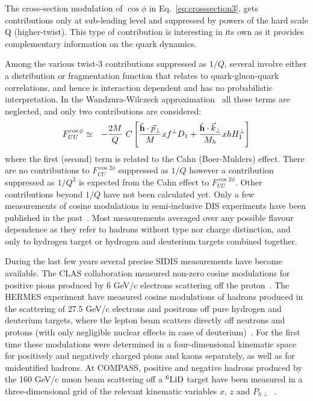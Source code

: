 \documentclass[aps,prl,twocolumn,showpacs,superscriptaddress,groupedaddress]{revtex4}  %
\newcommand{\Phperp}{P_{h\perp}}
\newcommand{\FUUc}{F_{UU}^{\cos\phi}}
\newcommand{\FUUcc}{F_{UU}^{\cos2\phi}}
\newcommand{\kt}{\vec{k}_\perp}
\newcommand{\pt}{\vec{p}_\perp}
\begin{document}
The cross-section modulation of  $\cos \phi $ in Eq.~\ref{eq:crosssection3}, gets contributions only
at sub-leading level and suppressed by powers of the hard scale Q (higher-twist).
This type of contribution is interesting in its own as it provides complementary information
on the quark dynamics.

Among the various twist-3 contributions suppressed as $1/Q$, several involve
either a distribution or fragmentation function that relates to
quark-gluon-quark correlations, and hence is interaction dependent and has no probabilistic
interpretation. In the Wandzura-Wilczeck approximation~\cite{Wandzura:1977qf}
all these terms are neglected, and only two contributions are considered: %
\begin{eqnarray} \nonumber
\label{Eq:cosphi}
\FUUc & \simeq & -\frac{2M}{Q}\  C\left[\frac{ \hat{\bf h} \cdot \pt}{M} xf^\perp D_1 +
\frac{\hat{\bf h} \cdot \kt}{M_h} 
xh H_1^\perp \right] \\
\end{eqnarray}
where the first (second) term is related to the Cahn (Boer-Mulders) effect.
There are no contributions to $\FUUcc$ suppressed as $1/Q$ however a contribution
suppressed as $1/Q^2$ is expected from the Cahn effect to $\FUUcc$. Other
contributions beyond $1/Q$ have not been calculated yet.
Only a few measurements of cosine modulations in semi-inclusive DIS experiments
have been published in the
past~\cite{Aubert:1983cz,Arneodo:1986cf,Adams:1993hs,Breitweg:2000qh}. Most
measurements averaged over any possible flavour dependence as they refer to
hadrons without type nor charge distinction, and only to hydrogen target or
hydrogen and deuterium targets combined together.

During the last few years several precise SIDIS measurements have become available. The CLAS
collaboration measured non-zero cosine modulations for positive pions produced
by 6 GeV/c electrons scattering off the proton~\cite{Osipenko:2008rv}.  The
HERMES experiment have measured cosine modulations of hadrons produced in the
scattering of 27.5 GeV/c electrons and positrons off pure hydrogen and deuterium
targets, where the lepton beam scatters directly off neutrons and protons (with
only negligible nuclear effects in case of
deuterium)~\cite{Airapetian:2012yg}. For the first time these modulations were
determined in a four-dimensional kinematic space for positively and negatively
charged pions and kaons separately, as well as for unidentified hadrons. At
COMPASS, positive and negative hadrons produced by the 160 GeV/c muon beam
scattering off a $\rm ^6LiD$ target have been measured in a three-dimensional
grid of the relevant kinematic variables $x$, $z$ and
$\Phperp$~\cite{Adolph:2014pwc}.
\end{document}
